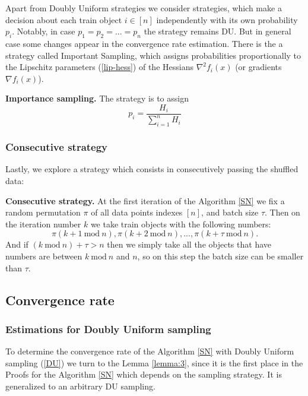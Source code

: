 \documentclass{article}
\theoremstyle{definition}
\theoremstyle{assumption}
\theoremstyle{lemma}
\theoremstyle{theorem}
\theoremstyle{proposition}
\begin{document}
	Apart from Doubly Uniform strategies we consider strategies, which make a decision about each train object $i \in [n]$ independently with its own probability $p_i$. Notably, in case $p_1 = p_2 =...= p_n$ the strategy remains DU. But in general case some changes appear in the convergence rate estimation. There is the a strategy called Important Sampling, which assigns probabilities proportionally to the Lipschitz parameters (\ref{lip-hess}) of the Hessians $\nabla^2 f_i(x)$ (or gradients $\nabla f_i(x)$).

	\textbf{Importance sampling.}\label{imp-hess} The strategy is to assign
	\begin{equation}
		p_i = \frac{H_i}{\sum \limits_{i=1}^n H_i}
	\end{equation}

	\subsubsection{Consecutive strategy}
	
	Lastly, we explore a strategy which consists in consecutively passing the shuffled data:
	
	\textbf{Consecutive strategy.}\label{consec} At the first iteration of the Algorithm \ref{SN} we fix a random permutation $\pi$ of all data points indexes $[n]$, and batch size $\tau$. Then on the iteration number $k$ we take train objects with the following numbers:
	\begin{equation}
		\pi(k+1\ \text{mod}\ n), \pi(k+2\ \text{mod}\ n), ..., \pi(k+\tau\ \text{mod}\ n).
	\end{equation}
	And if $(k\ \text{mod}\ n) + \tau > n$ then we simply take all the objects that have numbers are between $k\ \text{mod}\ n$ and $n$, so on this step the batch size can be smaller than $\tau$.

	\subsection {Convergence rate}
	
	\subsubsection{Estimations for Doubly Uniform sampling}
	
	To determine the convergence rate of the Algorithm \ref{SN} with Doubly Uniform sampling (\ref{DU}) we turn to the Lemma \ref{lemma:3}, since it is the first place in the Proofs for the Algorithm \ref{SN} which depends on the sampling strategy. It is generalized to an arbitrary DU sampling.
	
\end{document}
